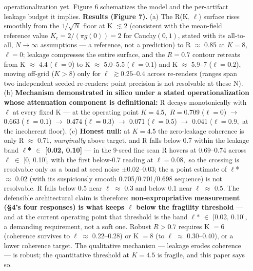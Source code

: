 \documentclass[
]{article}
\begin{document}
\begin{itemize}
  operationalization yet. Figure 6 schematizes the model and the
  per-artifact leakage budget it implies. \textbf{Results (Figure 7).}
  (a) The R(K, \(\ell\)) surface rises smoothly from the \(1/\sqrt{N}\)
  floor at K \(\lesssim 2\) (consistent with the mean-field reference
  value \(K_c = 2/(\pi g(0)) = 2\) for Cauchy\((0,1)\), stated with its
  all-to-all, \(N \to \infty\) assumptions --- a reference, not a
  prediction) to R \(\approx\) 0.85 at \(K = 8,\) \(\ell = 0\); leakage
  compresses the entire surface, and the \(R = 0.7\) contour retreats
  from K \(\approx\) 4.4 (\(\ell = 0\)) to K \(\approx\) 5.0--5.5
  (\(\ell = 0.1\)) and K \(\approx\) 5.9--7 (\(\ell = 0.2\)), moving
  off-grid (\(K > 8\)) only for \(\ell\) \(\gtrsim 0.25\)--0.4 across
  re-renders (ranges span two independent seeded re-renders; point
  precision is not resolvable at these N). (b) \textbf{Mechanism
  demonstrated in silico under a stated operationalization whose
  attenuation component is definitional:} R decays monotonically with
  \(\ell\) at every fixed K --- at the operating point \(K = 4.5,\)
  \(R = 0.709\) (\(\ell = 0\)) \(\to\) 0.663 (\(\ell = 0.1\)) \(\to\)
  0.474 (\(\ell = 0.3\)) \(\to\) 0.071 (\(\ell = 0.5\)) \(\to\) 0.041
  (\(\ell = 0.9,\) at the incoherent floor). (c) \textbf{Honest null:}
  at \(K = 4.5\) the zero-leakage coherence is only R \(\approx\) 0.71,
  \emph{marginally} above target, and R falls below 0.7 within the
  leakage band \textbf{\(\ell\)* \(\in\) {[}0.02, 0.10{]}} --- in the
  9-seed fine scan R hovers at 0.69--0.74 across \(\ell\) \(\in\) {[}0,
  0.10{]}, with the first below-0.7 reading at \(\ell = 0.08,\) so the
  crossing is resolvable only as a band at seed noise \(\pm 0.02–0.03\);
  the a point estimate of \(\ell\)* \(\approx\) 0.02 (with its
  suspiciously smooth 0.705/0.701/0.698 sequence) is not resolvable. R
  falls below 0.5 near \(\ell\) \(\approx\) 0.3 and below 0.1 near
  \(\ell\) \(\approx\) 0.5. The defensible architectural claim is
  therefore: \textbf{non-expropriative measurement (§4's four responses)
  is what keeps \(\ell\) below the fragility threshold} --- and at the
  current operating point that threshold is the band \(\ell\)* \(\in\)
  {[}0.02, 0.10{]}, a demanding requirement, not a soft one. Robust
  \(R > 0.7\) requires K \(= 6\) (coherence survives to \(\ell\)
  \(\approx\) 0.22--0.28) or K \(= 8\) (to \(\ell\) \(\approx\)
  0.30--0.40), or a lower coherence target. The qualitative mechanism
  --- leakage erodes coherence --- is robust; the quantitative threshold
  at \(K = 4.5\) is fragile, and this paper says so.

\end{itemize}
\end{document}

